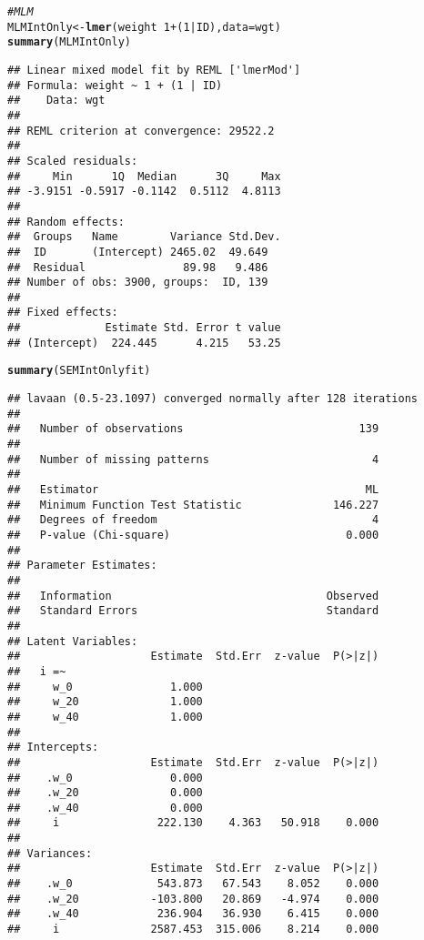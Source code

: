 \documentclass{article}\usepackage[]{graphicx}\usepackage[]{color}
\makeatletter
\newcommand{\hlnum}[1]{\textcolor[rgb]{0.686,0.059,0.569}{#1}}%
\newcommand{\hlcom}[1]{\textcolor[rgb]{0.678,0.584,0.686}{\textit{#1}}}%
\newcommand{\hlopt}[1]{\textcolor[rgb]{0,0,0}{#1}}%
\newcommand{\hlstd}[1]{\textcolor[rgb]{0.345,0.345,0.345}{#1}}%
\newcommand{\hlkwb}[1]{\textcolor[rgb]{0.69,0.353,0.396}{#1}}%
\newcommand{\hlkwc}[1]{\textcolor[rgb]{0.333,0.667,0.333}{#1}}%
\newcommand{\hlkwd}[1]{\textcolor[rgb]{0.737,0.353,0.396}{\textbf{#1}}}%
\newenvironment{kframe}{%
 \def\at@end@of@kframe{}%
 \ifinner\ifhmode%
  \def\at@end@of@kframe{\end{minipage}}%
  \begin{minipage}{\columnwidth}%
 \fi\fi%
 \def\FrameCommand##1{\hskip\@totalleftmargin \hskip-\fboxsep
 \colorbox{shadecolor}{##1}\hskip-\fboxsep
     \hskip-\linewidth \hskip-\@totalleftmargin \hskip\columnwidth}%
 \MakeFramed {\advance\hsize-\width
   \@totalleftmargin\z@ \linewidth\hsize
   \@setminipage}}%
 {\par\unskip\endMakeFramed%
 \at@end@of@kframe}
\newenvironment{knitrout}{}{} %
\makeatother
\begin{document}
\begin{knitrout}
\begin{kframe}
\begin{alltt}
\hlcom{# MLM}
\hlstd{MLMIntOnly} \hlkwb{<-} \hlkwd{lmer}\hlstd{(weight} \hlopt{~} \hlnum{1} \hlopt{+} \hlstd{(}\hlnum{1} \hlopt{|} \hlstd{ID),} \hlkwc{data} \hlstd{= wgt)}
\hlkwd{summary}\hlstd{(MLMIntOnly)}
\end{alltt}
\begin{verbatim}
## Linear mixed model fit by REML ['lmerMod']
## Formula: weight ~ 1 + (1 | ID)
##    Data: wgt
## 
## REML criterion at convergence: 29522.2
## 
## Scaled residuals: 
##     Min      1Q  Median      3Q     Max 
## -3.9151 -0.5917 -0.1142  0.5112  4.8113 
## 
## Random effects:
##  Groups   Name        Variance Std.Dev.
##  ID       (Intercept) 2465.02  49.649  
##  Residual               89.98   9.486  
## Number of obs: 3900, groups:  ID, 139
## 
## Fixed effects:
##             Estimate Std. Error t value
## (Intercept)  224.445      4.215   53.25
\end{verbatim}
\begin{alltt}
\hlkwd{summary}\hlstd{(SEMIntOnlyfit)}
\end{alltt}
\begin{verbatim}
## lavaan (0.5-23.1097) converged normally after 128 iterations
## 
##   Number of observations                           139
## 
##   Number of missing patterns                         4
## 
##   Estimator                                         ML
##   Minimum Function Test Statistic              146.227
##   Degrees of freedom                                 4
##   P-value (Chi-square)                           0.000
## 
## Parameter Estimates:
## 
##   Information                                 Observed
##   Standard Errors                             Standard
## 
## Latent Variables:
##                    Estimate  Std.Err  z-value  P(>|z|)
##   i =~                                                
##     w_0               1.000                           
##     w_20              1.000                           
##     w_40              1.000                           
## 
## Intercepts:
##                    Estimate  Std.Err  z-value  P(>|z|)
##    .w_0               0.000                           
##    .w_20              0.000                           
##    .w_40              0.000                           
##     i               222.130    4.363   50.918    0.000
## 
## Variances:
##                    Estimate  Std.Err  z-value  P(>|z|)
##    .w_0             543.873   67.543    8.052    0.000
##    .w_20           -103.800   20.869   -4.974    0.000
##    .w_40            236.904   36.930    6.415    0.000
##     i              2587.453  315.006    8.214    0.000

\end{verbatim}
\end{kframe}
\end{knitrout}
\end{document}

